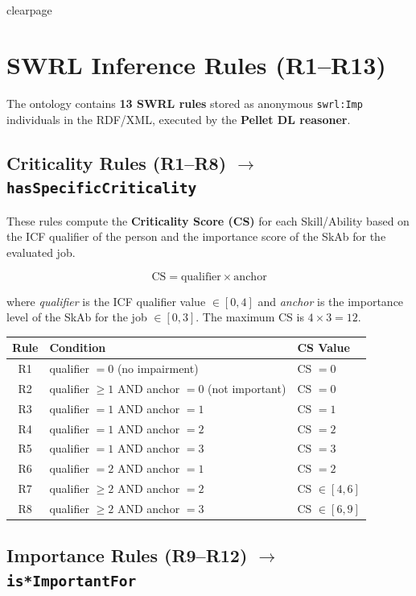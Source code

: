 ﻿\documentclass[12pt,a4paper]{article}
\begin{document}
\\clearpage
\section{SWRL Inference Rules (R1--R13)}

The ontology contains \textbf{13 SWRL rules} stored as anonymous \texttt{swrl:Imp} individuals in the RDF/XML, executed by the \textbf{Pellet DL reasoner}.

\subsection{Criticality Rules (R1--R8) $\rightarrow$ \texttt{hasSpecificCriticality}}

These rules compute the \textbf{Criticality Score (CS)} for each Skill/Ability based on the ICF qualifier of the person and the importance score of the SkAb for the evaluated job.

\begin{equation}
  \text{CS} = \text{qualifier} \times \text{anchor}
\end{equation}

where \textit{qualifier} is the ICF qualifier value $\in [0,4]$ and \textit{anchor} is the importance level of the SkAb for the job $\in [0,3]$. The maximum CS is $4 \times 3 = 12$.

\begin{longtable}{@{}cll@{}}
\toprule
\textbf{Rule} & \textbf{Condition} & \textbf{CS Value} \\
\midrule
\endhead
R1 & qualifier $= 0$ (no impairment) & CS $= 0$ \\
R2 & qualifier $\geq 1$ AND anchor $= 0$ (not important) & CS $= 0$ \\
R3 & qualifier $= 1$ AND anchor $= 1$ & CS $= 1$ \\
R4 & qualifier $= 1$ AND anchor $= 2$ & CS $= 2$ \\
R5 & qualifier $= 1$ AND anchor $= 3$ & CS $= 3$ \\
R6 & qualifier $= 2$ AND anchor $= 1$ & CS $= 2$ \\
R7 & qualifier $\geq 2$ AND anchor $= 2$ & CS $\in [4,6]$ \\
R8 & qualifier $\geq 2$ AND anchor $= 3$ & CS $\in [6,9]$ \\
\bottomrule
\end{longtable}

\subsection{Importance Rules (R9--R12) $\rightarrow$ \texttt{is*ImportantFor}}
\end{document}
